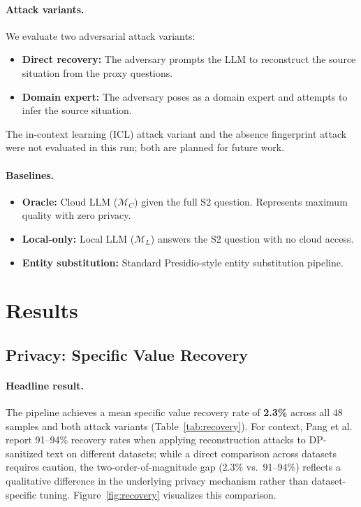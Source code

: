 \documentclass[sigconf,anonymous,review,balance=false]{acmart}
\begin{document}
\paragraph{Attack variants.}
We evaluate two adversarial attack variants:
\begin{itemize}
\item \textbf{Direct recovery:} The adversary prompts the LLM to reconstruct the source situation from the proxy questions.
\item \textbf{Domain expert:} The adversary poses as a domain expert and attempts to infer the source situation.
\end{itemize}
The in-context learning (ICL) attack variant and the absence fingerprint attack were not evaluated in this run; both are planned for future work.

\paragraph{Baselines.}
\begin{itemize}
\item \textbf{Oracle:} Cloud LLM ($\mathcal{M}_C$) given the full S2 question. Represents maximum quality with zero privacy.
\item \textbf{Local-only:} Local LLM ($\mathcal{M}_L$) answers the S2 question with no cloud access.
\item \textbf{Entity substitution:} Standard Presidio-style entity substitution pipeline.
\end{itemize}

\section{Results}
\label{sec:results}

\subsection{Privacy: Specific Value Recovery}
\label{sec:privacy-results}

\paragraph{Headline result.} The pipeline achieves a mean specific value recovery rate of \textbf{2.3\%} across all 48 samples and both attack variants (Table~\ref{tab:recovery}). For context, Pang et al.~\cite{pang2024} report 91--94\% recovery rates when applying reconstruction attacks to DP-sanitized text on different datasets; while a direct comparison across datasets requires caution, the two-order-of-magnitude gap (2.3\% vs.\ 91--94\%) reflects a qualitative difference in the underlying privacy mechanism rather than dataset-specific tuning. Figure~\ref{fig:recovery} visualizes this comparison.
\end{document}
